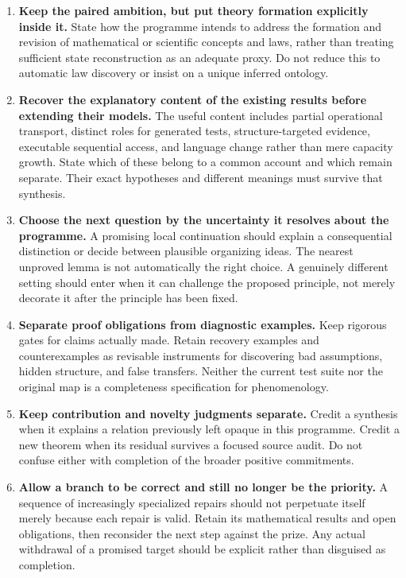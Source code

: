 \documentclass[11pt]{article}
\begin{document}
\begin{enumerate}
\item \textbf{Keep the paired ambition, but put theory formation explicitly inside it.} State how the programme intends to address the formation and revision of mathematical or scientific concepts and laws, rather than treating sufficient state reconstruction as an adequate proxy. Do not reduce this to automatic law discovery or insist on a unique inferred ontology.

\item \textbf{Recover the explanatory content of the existing results before extending their models.} The useful content includes partial operational transport, distinct roles for generated tests, structure-targeted evidence, executable sequential access, and language change rather than mere capacity growth. State which of these belong to a common account and which remain separate. Their exact hypotheses and different meanings must survive that synthesis.

\item \textbf{Choose the next question by the uncertainty it resolves about the programme.} A promising local continuation should explain a consequential distinction or decide between plausible organizing ideas. The nearest unproved lemma is not automatically the right choice. A genuinely different setting should enter when it can challenge the proposed principle, not merely decorate it after the principle has been fixed.

\item \textbf{Separate proof obligations from diagnostic examples.} Keep rigorous gates for claims actually made. Retain recovery examples and counterexamples as revisable instruments for discovering bad assumptions, hidden structure, and false transfers. Neither the current test suite nor the original map is a completeness specification for phenomenology.

\item \textbf{Keep contribution and novelty judgments separate.} Credit a synthesis when it explains a relation previously left opaque in this programme. Credit a new theorem when its residual survives a focused source audit. Do not confuse either with completion of the broader positive commitments.

\item \textbf{Allow a branch to be correct and still no longer be the priority.} A sequence of increasingly specialized repairs should not perpetuate itself merely because each repair is valid. Retain its mathematical results and open obligations, then reconsider the next step against the prize. Any actual withdrawal of a promised target should be explicit rather than disguised as completion.
\end{enumerate}
\end{document}

